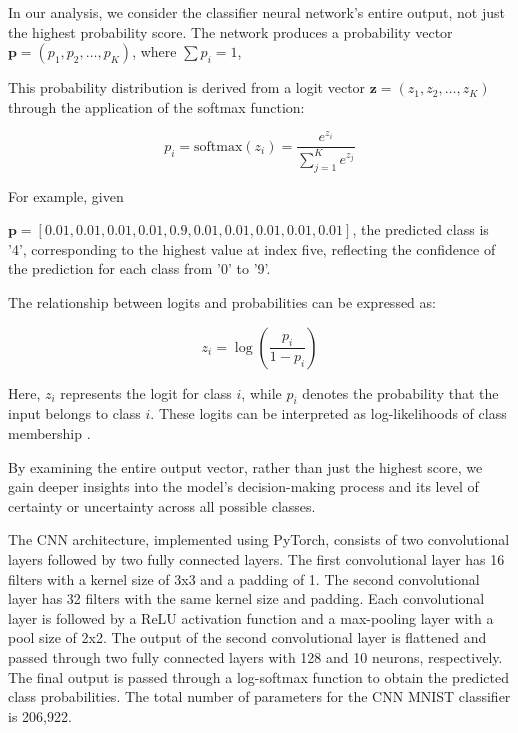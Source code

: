 In our analysis, we consider the classifier neural network's entire output, not just the highest probability score. The network produces a probability vector $\mathbf{p} = (p_1, p_2, \dots, p_K)$, where $\sum p_i = 1$,

This probability distribution is derived from a logit vector $\mathbf{z} = (z_1, z_2, \dots, z_K)$ through the application of the softmax function:

\begin{equation}
p_i = \text{softmax}(z_i) = \frac{e^{z_i}}{\sum_{j=1}^{K} e^{z_j}}
\end{equation}

For example, given 

$\mathbf{p} = [0.01, 0.01, 0.01, 0.01, 0.9, 0.01, 0.01, 0.01, 0.01, 0.01]$, the predicted class is '4', corresponding to the highest value at index five, reflecting the confidence of the prediction for each class from '0' to '9'.

The relationship between logits and probabilities can be expressed as:

\begin{equation}
z_i = \log \left(\frac{p_i}{1 - p_i}\right)
\end{equation}

Here, $z_i$ represents the logit for class $i$, while $p_i$ denotes the probability that the input belongs to class $i$. These logits can be interpreted as log-likelihoods of class membership \cite{goodfellow2016deep, bishop2006pattern}.

By examining the entire output vector, rather than just the highest score, we gain deeper insights into the model's decision-making process and its level of certainty or uncertainty across all possible classes.

The CNN architecture, implemented using PyTorch, consists of two convolutional layers followed by two fully connected layers. The first convolutional layer has 16 filters with a kernel size of 3x3 and a padding of 1. The second convolutional layer has 32 filters with the same kernel size and padding. Each convolutional layer is followed by a ReLU activation function and a max-pooling layer with a pool size of 2x2. The output of the second convolutional layer is flattened and passed through two fully connected layers with 128 and 10 neurons, respectively. The final output is passed through a log-softmax function to obtain the predicted class probabilities. The total number of parameters for the CNN MNIST classifier is 206,922.


